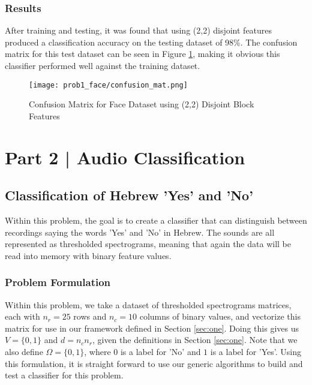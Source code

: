 \documentclass{article}[12pt]
\begin{document}
   \subsubsection{Results}
   After training and testing, it was found that using (2,2) disjoint features produced a classification accuracy on the testing dataset of 98\%. The confusion matrix for this test dataset can be seen in Figure \ref{fig:cm1face}, making it obvious this classifier performed well against the training dataset.
   
   \begin{figure}[!htb]
   	\centering
   	\texttt{[image: prob1\_face/confusion\_mat.png]}
   	\caption{Confusion Matrix for Face Dataset using (2,2) Disjoint Block Features}
   	\label{fig:cm1face}
   \end{figure}
   
   \newpage
   \section{Part 2 | Audio Classification}
   \subsection{Classification of Hebrew 'Yes' and 'No'}
   Within this problem, the goal is to create a classifier that can distinguish between recordings saying the words 'Yes' and 'No' in Hebrew. The sounds are all represented as thresholded spectrograms, meaning that again the data will be read into memory with binary feature values. 
   
   \subsubsection{Problem Formulation}
   Within this problem, we take a dataset of thresholded spectrograms matrices, each with $n_r = 25$ rows and $n_c = 10$ columns of binary values, and vectorize this matrix for use in our framework defined in Section \ref{sec:one}. Doing this gives us $V = \lbrace 0, 1 \rbrace $ and $d = n_c n_r$, given the definitions in Section \ref{sec:one}. Note that we also define $\Omega = \lbrace 0, 1\rbrace$, where $0$ is a label for 'No' and $1$ is a label for 'Yes'. Using this formulation, it is straight forward to use our generic algorithms to build and test a classifier for this problem.
   
\end{document}
